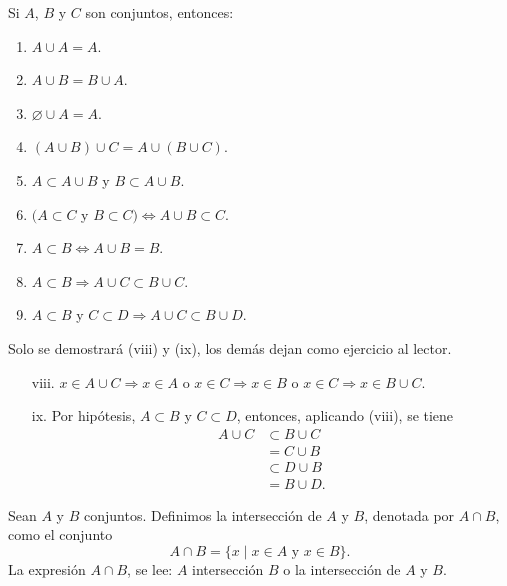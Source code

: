 \newpage

\begin{prop}{}{}
    Si $A$, $B$ y $C$ son conjuntos, entonces:
    \begin{enumerate}[label=\roman*., topsep=6pt, itemsep=0pt]
        \item $A \cup A = A$.
        \item $A \cup B = B \cup A$.
        \item $\varnothing \cup A = A$.
        \item $(A \cup B) \cup C = A \cup(B \cup C)$.
        \item $A \subset A \cup B$ y $B \subset A \cup B$.
        \item $(A \subset C$ y $B \subset C) \Longleftrightarrow A \cup B \subset C$.
        \item $A \subset B \Longleftrightarrow A \cup B=B$.
        \item $A \subset B \Longrightarrow A \cup C \subset B \cup C$.
        \item $A \subset B$ y $C \subset D \Longrightarrow A \cup C \subset B \cup D$.
    \end{enumerate}
    \tcblower
    \demostracion Solo se demostrará (viii) y (ix), los demás dejan como ejercicio al lector.
    \begin{enumerate}[label=\roman*., topsep=6pt, itemsep=0pt]
        \item[viii.] $x \in A \cup C \Longrightarrow x \in A$ o $x \in C \Longrightarrow x \in B$ o $x \in C \Longrightarrow x \in B \cup C$.
        \item[ix.] Por hipótesis, $A \subset B$ y $C \subset D$, entonces, aplicando (viii), se tiene
        \begin{align*}
            A \cup C & \subset B \cup C \\
            & = C \cup B \\
            & \subset D \cup B \\
            & = B \cup D.
        \end{align*}
    \end{enumerate}
\end{prop}

\begin{definicion}{}{}
    Sean $A$ y $B$ conjuntos. Definimos la intersección de $A$ y $B$, denotada por $A \cap B$, como el conjunto
    $$A \cap B = \{x \mid x \in A \text { y } x \in B\}.$$
    La expresión $A \cap B$, se lee: $A$ intersección $B$ o la intersección de $A$ y $B$.
\end{definicion}

